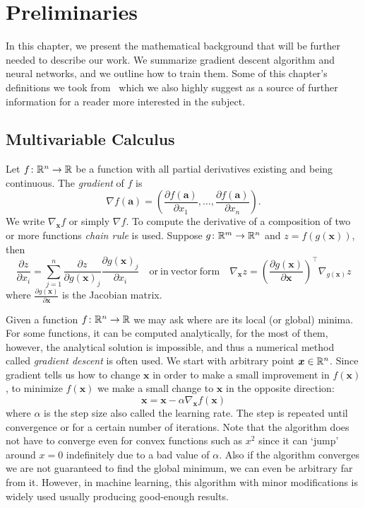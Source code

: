 \chapter{Preliminaries}\label{chap:preliminaries}


In this chapter, we present the mathematical background that will be further needed to describe our work. We summarize gradient descent algorithm and neural networks, and we outline how to train them. Some of this chapter's definitions we took from~\cite{Goodfellow-et-al-2016} which we also highly suggest as a source of further information for a reader more interested in the subject.


\section{Multivariable Calculus}
Let $f\colon\mathbb{R}^n\to\mathbb{R}$ be a function with all partial derivatives existing and being continuous. The \textit{gradient} of $f$ is
\begin{equation*}
\nabla f(\bm{a})=\left(\frac{\partial f(\bm{a})}{\partial x_1},\dots,\frac{\partial f(\bm{a})}{\partial x_n}\right).
\end{equation*}
We write $\nabla_{\bm{x}} f$ or simply $\nabla f$.
To compute the derivative of a composition of two or more functions \textit{chain rule} is used. Suppose $g\colon\mathbb{R}^m\to\mathbb{R}^n$ and $z=f(g(\bm{x}))$, then
\begin{equation*}
\frac{\partial z}{\partial x_i}=\sum\limits_{j=1}^n\frac{\partial z}{\partial g(\bm{x})_j}\frac{\partial g(\bm{x})_j}{\partial x_i}\quad\mathrm{or\ in\ vector\ form}\quad\nabla_{\bm{x}}z=\left(\frac{\partial g(\bm{x})}{\partial\bm{x}}\right)^\top\nabla_{g(\bm{x})}z
\end{equation*}
where $\frac{\partial g(\bm{x})}{\partial\bm{x}}$ is the Jacobian matrix.

Given a function $f\colon\mathbb{R}^n\to\mathbb{R}$ we may ask where are its local (or global) minima. For some functions, it can be computed analytically, for the most of them, however, the analytical solution is impossible, and thus a numerical method called \textit{gradient descent} is often used. We start with arbitrary point $\bm{x}\in \mathbb{R}{^n}$. Since gradient tells us how to change $\bm{x}$ in order to make a small improvement in $f(\bm{x})$, to minimize $f(\bm{x})$ we make a small change to $\bm{x}$ in the opposite direction:
\begin{equation*}
\bm{x}=\bm{x}-\alpha\nabla_{\bm{x}}f(\bm{x})
\end{equation*}
where $\alpha$ is the step size also called the learning rate. The step is repeated until convergence or for a certain number of iterations. Note that the algorithm does not have to converge even for convex functions such as $x^2$ since it can `jump' around $x=0$ indefinitely due to a bad value of $\alpha$.
Also if the algorithm converges we are not guaranteed to find the global minimum, we can even be arbitrary far from it. However, in machine learning, this algorithm with minor modifications is widely used usually producing good-enough results.

